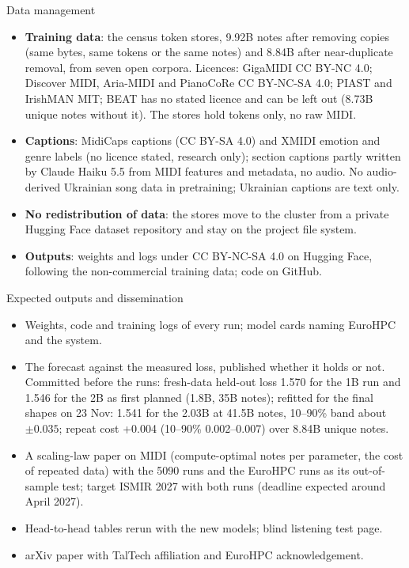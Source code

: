 \documentclass[11pt,a4paper]{article}
\makeatletter
\renewcommand\section{\@startsection{section}{1}{\z@}{-3.2ex \@plus -1ex \@minus -.2ex}{1.8ex \@plus .2ex}%
  {\normalfont\Large\bfseries\color{head}}}
\makeatother
\begin{document}
\section{Data management}\label{sec:data}
\begin{itemize}
\item \textbf{Training data}: the census token stores, 9.92B notes after removing copies (same bytes, same tokens or the same notes) and 8.84B after
near-duplicate removal, from seven open corpora. Licences: GigaMIDI CC BY-NC 4.0; Discover MIDI, Aria-MIDI and
PianoCoRe CC BY-NC-SA 4.0; PIAST and IrishMAN MIT; BEAT has no stated licence and can be left out (8.73B unique notes
without it). The stores hold tokens only, no raw MIDI.
\item \textbf{Captions}: MidiCaps captions (CC BY-SA 4.0) and XMIDI emotion and genre labels (no licence stated,
research only); section captions partly written by Claude Haiku 5.5 from MIDI features and metadata, no audio.
No audio-derived Ukrainian song data in pretraining; Ukrainian captions are text only.
\item \textbf{No redistribution of data}: the stores move to the cluster from a private Hugging Face dataset
repository and stay on the project file system.
\item \textbf{Outputs}: weights and logs under CC BY-NC-SA 4.0 on Hugging Face, following the non-commercial
training data; code on GitHub.
\end{itemize}

\section{Expected outputs and dissemination}\label{sec:outputs}
\begin{itemize}
\item Weights, code and training logs of every run; model cards naming EuroHPC and the system.
\item The forecast against the measured loss, published whether it holds or not. Committed before the runs: fresh-data
held-out loss 1.570 for the 1B run and 1.546 for the 2B as first planned (1.8B, 35B notes); refitted for the final
shapes on 23 Nov: 1.541 for the 2.03B at 41.5B notes, 10--90\% band about $\pm0.035$; repeat cost +0.004 (10--90\%
0.002--0.007) over 8.84B unique notes.
\item A scaling-law paper on MIDI (compute-optimal notes per parameter, the cost of repeated data) with the 5090
runs and the EuroHPC runs as its out-of-sample test; target ISMIR 2027 with both runs (deadline expected around April
2027).
\item Head-to-head tables rerun with the new models; blind listening test page.
\item arXiv paper with TalTech affiliation and EuroHPC acknowledgement.
\end{itemize}
\end{document}
